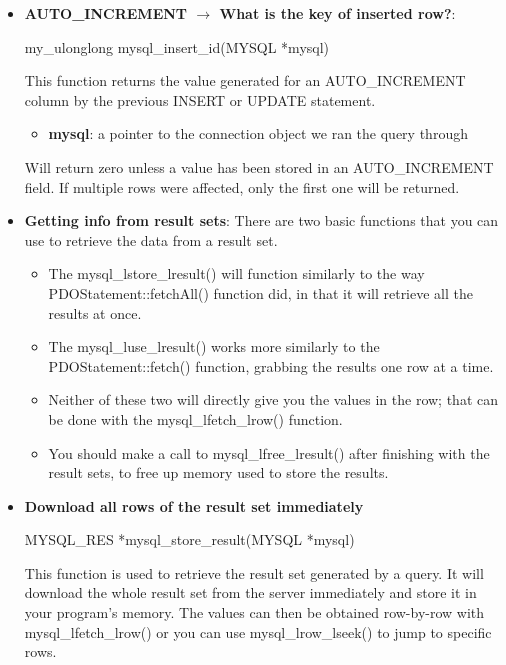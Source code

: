 \documentclass{report}
\begin{document}
\begin{itemize}
\begin{itemize}
            \end{itemize}
        \item \textbf{AUTO\_INCREMENT $\to$ What is the key of inserted row?}:
            \bigbreak \noindent 
            \begin{cppcode}
                my_ulonglong mysql_insert_id(MYSQL *mysql)
            \end{cppcode}
            \bigbreak \noindent 
            This function returns the value generated for an AUTO\_INCREMENT column by the previous INSERT or UPDATE statement.
            \begin{itemize}
                \item \textbf{mysql}: a pointer to the connection object we ran the query through
            \end{itemize}
            \bigbreak \noindent 
            Will return zero unless a value has been stored in an AUTO\_INCREMENT field. If multiple rows were affected, only the first one will be returned.
        \item \textbf{Getting info from result sets}: There are two basic functions that you can use to retrieve the data from a result set.
            \begin{itemize}
                \item The mysql\_lstore\_lresult() will function similarly to the way PDOStatement::fetchAll() function did, in that it will retrieve all the results at once.
                \item The mysql\_luse\_lresult() works more similarly to the PDOStatement::fetch() function, grabbing the results one row at a time.
                \item Neither of these two will directly give you the values in the row; that can be done with the mysql\_lfetch\_lrow() function.
                \item You should make a call to mysql\_lfree\_lresult() after finishing with the result sets, to free up memory used to store the results.
            \end{itemize}
        \item \textbf{Download all rows of the result set immediately}
            \bigbreak \noindent 
            \begin{cppcode}
                MYSQL_RES *mysql_store_result(MYSQL *mysql)
            \end{cppcode}
            \bigbreak \noindent 
            This function is used to retrieve the result set generated by a query. It will download the whole result set from the server immediately and store it in your program's memory. The values can then be obtained row-by-row with mysql\_lfetch\_lrow() or you can use mysql\_lrow\_lseek() to jump to specific rows.

\end{itemize}
\end{document}
